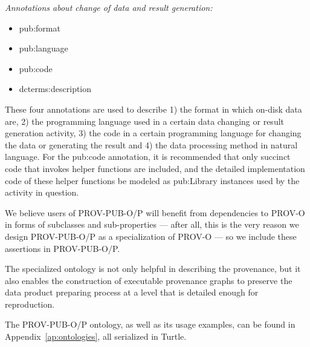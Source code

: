 \noindent\emph{Annotations about change of data and result generation:}
\begin{itemize}
	\item pub:format
	\item pub:language%
	\item pub:code%
	\item dcterms:description%
\end{itemize}
These four annotations are used to describe 1) the format in which on-disk data are, 2) the programming language used in a certain data changing or result generation activity, 3) the code in a certain programming language for changing the data or generating the result and 4) the data processing method in natural language. For the pub:code annotation, it is recommended that only succinct code that invokes helper functions are included, and the detailed implementation code of these helper functions be modeled as pub:Library instances used by the activity in question.

We believe users of PROV-PUB-O/P will benefit from dependencies to PROV-O in forms of subclasses and sub-properties --- after all, this is the very reason we design PROV-PUB-O/P as a specialization of PROV-O --- so we include these assertions in PROV-PUB-O/P.

The specialized ontology is not only helpful in describing the provenance, but it also enables the construction of executable provenance graphs to preserve the data product preparing process at a level that is detailed enough for reproduction.

The PROV-PUB-O/P ontology, as well as its usage examples, can be found in Appendix~\ref{ap:ontologies}, all serialized in Turtle.

